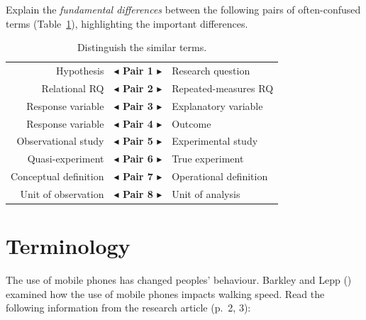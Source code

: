 \documentclass[
  11pt,
  a4paper,
  krantz2]{krantz}
\begin{document}
Explain the \emph{fundamental differences} between the following pairs of often-confused terms (Table~\ref{tab:SimilarTerms}), highlighting the important differences.

\begin{table}
\centering
\caption{\label{tab:SimilarTerms}Distinguish the similar terms.}
\centering
\fontsize{10}{12}\selectfont
\begin{tabular}[t]{r>{}cl}
\toprule
Hypothesis & \textbf{$\blacktriangleleft$ Pair 1 $\blacktriangleright$} & Research question\\
Relational RQ & \textbf{$\blacktriangleleft$ Pair 2 $\blacktriangleright$} & Repeated-measures RQ\\
\addlinespace
Response variable & \textbf{$\blacktriangleleft$ Pair 3 $\blacktriangleright$} & Explanatory variable\\
Response variable & \textbf{$\blacktriangleleft$ Pair 4 $\blacktriangleright$} & Outcome\\
\addlinespace
Observational study & \textbf{$\blacktriangleleft$ Pair 5 $\blacktriangleright$} & Experimental study\\
Quasi-experiment & \textbf{$\blacktriangleleft$ Pair 6 $\blacktriangleright$} & True experiment\\
\addlinespace
Conceptual definition & \textbf{$\blacktriangleleft$ Pair 7 $\blacktriangleright$} & Operational definition\\
Unit of observation & \textbf{$\blacktriangleleft$ Pair 8 $\blacktriangleright$} & Unit of analysis\\
\bottomrule
\end{tabular}
\end{table}

\section{Terminology}\label{UnderstandingTerminology2}

The use of mobile phones has changed peoples' behaviour.
Barkley and Lepp () examined how the use of mobile phones impacts walking speed.
Read the following information from the research article (p.~2, 3):
\end{document}
